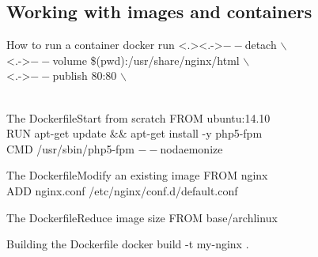 \documentclass{beamer}
\begin{document}
    \subsection{Working with images and containers}
    \begin{frame}{How to run a container}
        \alert<+>{docker run}
        \alert<.>{\only<.->{$--$detach $\backslash$\\}}
        \alert<+>{\only<.->{$--$volume \$(pwd):/usr/share/nginx/html $\backslash$\\}}
        \alert<+>{\only<.->{$--$publish 80:80 $\backslash$\\}}
        \\
    \end{frame}
    \begin{frame}{The Dockerfile}{Start from scratch}
        \alert<+>{}
        \alert<+>{FROM ubuntu:14.10\\}
        \alert<+>{RUN apt-get update \&\& apt-get install -y php5-fpm\\}
        \alert<+>{CMD /usr/sbin/php5-fpm $--$nodaemonize\\}
    \end{frame}
    \begin{frame}{The Dockerfile}{Modify an existing image}
        \alert<+>{}
        FROM nginx\\
        \alert<+>{ADD nginx.conf /etc/nginx/conf.d/default.conf\\}
    \end{frame}
    \begin{frame}{The Dockerfile}{Reduce image size}
        FROM base/archlinux\\
    \end{frame}
    \begin{frame}{Building the Dockerfile}
        docker build -t my-nginx .
    \end{frame}
\end{document}
